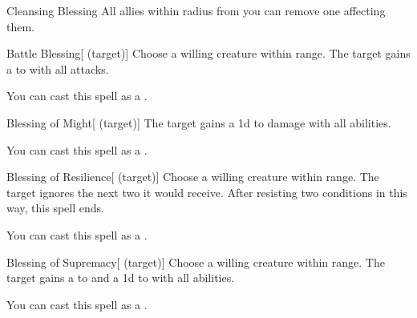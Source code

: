 \lowercase{\hypertarget{spell:Cleansing Blessing}{}}\label{spell:Cleansing Blessing}
\begin{apability}[\nth{1}]{\hypertarget{spell:Cleansing Blessing}{Cleansing Blessing}}
All allies within \arealarge radius from you can remove one  affecting them.
\end{apability}
\vspace{0.25em}



\lowercase{\hypertarget{spell:Battle Blessing}{}}\label{spell:Battle Blessing}
\begin{attuneability}[\nth{2}]{\hypertarget{spell:Battle Blessing}{Battle Blessing}}[ (target)]
Choose a willing creature within \rngclose range.
The target gains a   to  with all attacks.

You can cast this spell as a .
\end{attuneability}
\vspace{0.25em}



\lowercase{\hypertarget{spell:Blessing of Might}{}}\label{spell:Blessing of Might}
\begin{attuneability}[\nth{3}]{\hypertarget{spell:Blessing of Might}{Blessing of Might}}[ (target)]
The target gains a \plus1d  to damage with all abilities.

You can cast this spell as a .
\end{attuneability}
\vspace{0.25em}



\lowercase{\hypertarget{spell:Blessing of Resilience}{}}\label{spell:Blessing of Resilience}
\begin{attuneability}[\nth{3}]{\hypertarget{spell:Blessing of Resilience}{Blessing of Resilience}}[ (target)]
Choose a willing creature within \rngclose range.
The target ignores the next two  it would receive.
After resisting two conditions in this way, this spell ends.

You can cast this spell as a .
\end{attuneability}
\vspace{0.25em}



\lowercase{\hypertarget{spell:Blessing of Supremacy}{}}\label{spell:Blessing of Supremacy}
\begin{attuneability}[\nth{4}]{\hypertarget{spell:Blessing of Supremacy}{Blessing of Supremacy}}[ (target)]
Choose a willing creature within \rngclose range.
The target gains a   to  and a \plus1d  to  with all abilities.

You can cast this spell as a .
\end{attuneability}
\vspace{0.25em}



